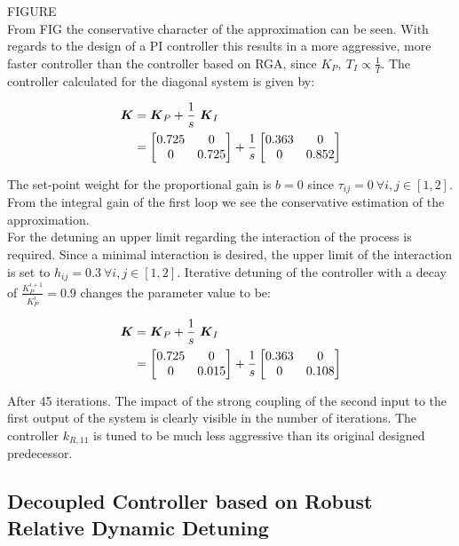FIGURE\\

From FIG the conservative character of the approximation can be seen. With regards to the design of a PI controller this results in a more aggressive, more faster controller than the controller based on RGA, since $K_P,~T_I \propto \frac{1}{T}$. The controller calculated for the diagonal system is given by:

\begin{align}
\mbox{\boldmath$K$} &= \mbox{\boldmath$K$}_P + \frac{1}{s}~ \mbox{\boldmath$K$}_I\\
&= \begin{bmatrix}
0.725 & 0 \\
0 & 0.725
\end{bmatrix}
+ \frac{1}{s}\begin{bmatrix}
0.363 & 0 \\
0 & 0.852
\end{bmatrix}
\end{align}

 The set-point weight for the proportional gain is $b = 0$ since $\tau_{ij} = 0 ~\forall i,j \in [1,2]$. From the integral gain of the first loop we see the conservative estimation of the approximation.\\

 For the detuning an upper limit regarding the interaction of the process is required. Since a minimal interaction is desired, the upper limit of the interaction is set to $h_{ij} = 0.3 ~ \forall i,j \in [1,2]$. Iterative detuning of the controller with a decay of $\frac{K_P^{i+1}}{K_P^{i}} = 0.9 $ changes the parameter value to be:

\begin{align}
\mbox{\boldmath$K$} &= \mbox{\boldmath$K$}_P + \frac{1}{s}~ \mbox{\boldmath$K$}_I\\
&= \begin{bmatrix}
0.725 & 0 \\
0 & 0.015
\end{bmatrix}
+ \frac{1}{s}\begin{bmatrix}
0.363 & 0 \\
0 & 0.108
\end{bmatrix}
\end{align}

After 45 iterations. The impact of the strong coupling of the second input to the first output of the system is clearly visible in the number of iterations. The controller $k_{R,11}$ is tuned to be much less aggressive than its original designed predecessor.


\subsection{Decoupled Controller based on Robust Relative Dynamic Detuning}
\label{c:fotd:s:rosenbrock:ss:modifiedastr}

